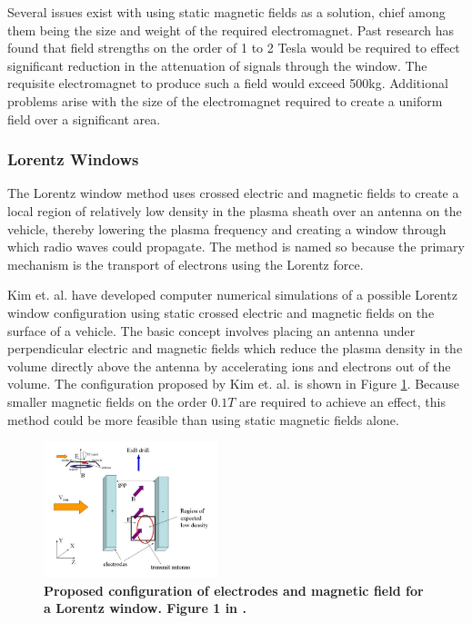 \documentclass[twocolumn]{article}
\begin{document}
			Several issues exist with using static magnetic fields as a solution, chief among them being the size and weight of the required electromagnet.
			Past research has found that field strengths on the order of 1 to 2 Tesla would be required to effect significant reduction in the attenuation of signals through the window.\cite{otsu_feasibility_2006}\cite{kim_electromagnetic_2009}
			The requisite electromagnet to produce such a field would exceed 500kg.
			Additional problems arise with the size of the electromagnet required to create a uniform field over a significant area.\cite{kim_electromagnetic_2009}
			
		
		\subsubsection*{Lorentz Windows}
			The Lorentz window method uses crossed electric and magnetic fields to create a local region of relatively low density in the plasma sheath over an antenna on the vehicle, thereby lowering the plasma frequency and creating a window through which radio waves could propagate.
			The method is named so because the primary mechanism is the transport of electrons using the Lorentz force.
			
			Kim et. al. have developed computer numerical simulations of a possible Lorentz window configuration using static crossed electric and magnetic fields on the surface of a vehicle.\cite{kim_plasma_2007}\cite{kim_analysis_2008}\cite{kim_modeling_2010}
			The basic concept involves placing an antenna under perpendicular electric and magnetic fields which reduce the plasma density in the volume directly above the antenna by accelerating ions and electrons out of the volume.
			The configuration proposed by Kim et. al. is shown in Figure \ref{fig:KimExBConfig}.
			Because smaller magnetic fields on the order $0.1 T$ are required to achieve an effect, this method could be more feasible than using static magnetic fields alone.
		
			\begin{figure}[H]
				\centering
					\includegraphics[width=0.45\textwidth]{Images/Kimetal_ExB_config.png}
				\caption{\textbf{Proposed configuration of electrodes and magnetic field for a Lorentz window. Figure 1 in \cite{kim_plasma_2007}.}}
				\label{fig:KimExBConfig}
			\end{figure}
			
\end{document}
